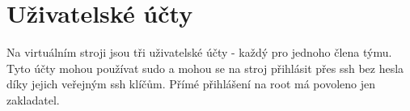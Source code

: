 \section{Uživatelské účty}
Na virtuálním stroji jsou tři uživatelské účty - každý pro jednoho člena týmu. Tyto účty mohou používat sudo a mohou se na stroj přihlásit přes ssh bez hesla díky jejich veřejným ssh klíčům.
Přímé přihlášení na root má povoleno jen zakladatel.